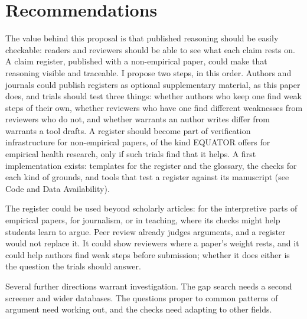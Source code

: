 \documentclass[12pt, a4paper]{article}
\begin{document}
\section{Recommendations}
\label{sec:recs}

The value behind this proposal is that published reasoning should be
easily checkable: readers and reviewers should be able to see what each claim
rests on.  A claim register, published with a non-empirical paper, could make that reasoning visible and traceable.  I propose
two steps, in this order.  Authors and journals could publish registers
as optional supplementary material, as this paper does, and trials
should test three things: whether authors who keep one find weak steps
of their own, whether reviewers who have one find different weaknesses
from reviewers who do not, and whether warrants an author writes differ
from warrants a tool drafts.  A register should become part of
verification infrastructure for non-empirical papers, of the kind
EQUATOR offers for empirical health research, only if such trials find
that it helps.  A first implementation exists: templates for the
register and the glossary, the checks for each kind of grounds, and
tools that test a register against its manuscript (see Code and Data
Availability).

The register could be used beyond scholarly articles: for the interpretive parts of empirical papers, for journalism, or in teaching, where its checks might help students learn to argue.  Peer review already judges arguments, and a
register would not replace it.  It could show reviewers where a paper's
weight rests, and it could help authors find weak steps before
submission; whether it does either is the question the trials should
answer.

Several further directions warrant investigation.  The gap search needs
a second screener and wider databases.  The questions proper to common
patterns of argument need working out, and the checks need adapting to
other fields.

\end{document}
